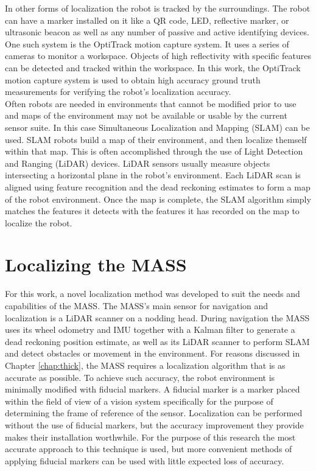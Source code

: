In other forms of localization the robot is tracked by the surroundings. The robot can have a marker installed on it like a QR code, LED, reflective marker, or ultrasonic beacon as well as any number of passive and active identifying devices. One such system is the OptiTrack motion capture system. It uses a series of cameras to monitor a workspace. Objects of high reflectivity with specific features can be detected and tracked within the workspace. In this work, the OptiTrack motion capture system is used to obtain high accuracy ground truth measurements for verifying the robot's localization accuracy.\\

Often robots are needed in environments that cannot be modified prior to use and maps of the environment may not be available or usable by the current sensor suite. In this case Simultaneous Localization and Mapping (SLAM) can be used. SLAM robots build a map of their environment, and then localize themself within that map. This is often accomplished through the use of Light Detection and Ranging (LiDAR) devices. LiDAR sensors usually measure objects intersecting a horizontal plane in the robot's environment. Each LiDAR scan is aligned using feature recognition and the dead reckoning estimates to form a map of the robot environment. Once the map is complete, the SLAM algorithm simply matches the features it detects with the features it has recorded on the map to localize the robot.\\

\section{Localizing the MASS}

For this work, a novel localization method was developed to suit the needs and capabilities of the MASS. The MASS's main sensor for navigation and localization is a LiDAR scanner on a nodding head. During navigation the MASS uses its wheel odometry and IMU together with a Kalman filter to generate a dead reckoning position estimate, as well as its LiDAR scanner to perform SLAM and detect obstacles or movement in the environment. For reasons discussed in Chapter \ref{chap:thick}, the MASS requires a localization algorithm that is as accurate as possible. To achieve such accuracy, the robot environment is minimally modified with fiducial markers. A fiducial marker is a marker placed within the field of view of a vision system specifically for the purpose of determining the frame of reference of the sensor. Localization can be performed without the use of fiducial markers, but the accuracy improvement they provide makes their installation worthwhile. For the purpose of this research the most accurate approach to this technique is used, but more convenient methods of applying fiducial markers can be used with little expected loss of accuracy.\\

